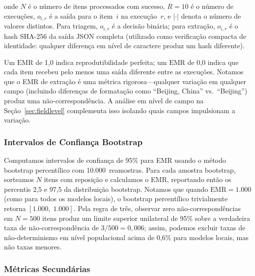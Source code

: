 \documentclass[12pt, a4paper]{article}
\newcommand{\emr}{\textrm{EMR}}
\newcommand{\ci}[2]{[#1,\;#2]}
\begin{document}
\noindent onde $N$ é o número de itens processados com sucesso, $R{=}10$ é o número de execuções, $o_{i,r}$ é a saída para o item~$i$ na execução~$r$, e $|\cdot|$ denota o número de valores distintos.
Para triagem, $o_{i,r}$ é a decisão binária; para extração, $o_{i,r}$ é o hash SHA-256 da saída JSON completa (utilizado como verificação compacta de identidade: qualquer diferença em nível de caractere produz um hash diferente).

Um $\emr$ de 1,0 indica reprodutibilidade perfeita; um $\emr$ de 0,0 indica que cada item recebeu pelo menos uma saída diferente entre as execuções.
Notamos que o EMR de extração é uma métrica rigorosa---qualquer variação em qualquer campo (incluindo diferenças de formatação como ``Beijing, China'' vs.\ ``Beijing'') produz uma não-correspondência.
A análise em nível de campo na Seção~\ref{sec:fieldlevel} complementa isso isolando quais campos impulsionam a variação.

\subsubsection{Intervalos de Confiança Bootstrap}

Computamos intervalos de confiança de 95\% para EMR usando o método bootstrap percentílico com 10.000~reamostras.
Para cada amostra bootstrap, sorteamos $N$ itens com reposição e calculamos o EMR, reportando então os percentis 2,5 e 97,5 da distribuição bootstrap.
Notamos que quando $\emr{=}1.000$ (como para todos os modelos locais), o bootstrap percentílico trivialmente retorna $\ci{1.000}{1.000}$.
Pela regra de três, observar zero não-correspondências em $N{=}500$ itens produz um limite superior unilateral de 95\% sobre a verdadeira taxa de não-correspondência de $3/500{=}0,006$; assim, podemos excluir taxas de não-determinismo em nível populacional acima de 0,6\% para modelos locais, mas não taxas menores.

\subsubsection{Métricas Secundárias}
\end{document}
